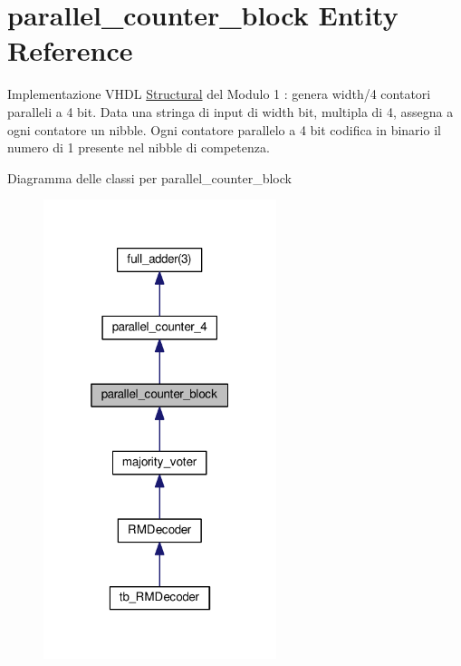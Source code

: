 \hypertarget{classparallel__counter__block}{\section{parallel\+\_\+counter\+\_\+block Entity Reference}
\label{classparallel__counter__block}
}


Implementazione V\+H\+D\+L \hyperlink{classparallel__counter__block_1_1_structural}{Structural} del Modulo 1 \+: genera width/4 contatori paralleli a 4 bit. Data una stringa di input di width bit, multipla di 4, assegna a ogni contatore un nibble. Ogni contatore parallelo a 4 bit codifica in binario il numero di 1 presente nel nibble di competenza.  




Diagramma delle classi per parallel\+\_\+counter\+\_\+block\nopagebreak
\begin{figure}[H]
\begin{center}
\leavevmode
\includegraphics[width=193pt]{classparallel__counter__block__inherit__graph}
\end{center}
\end{figure}


